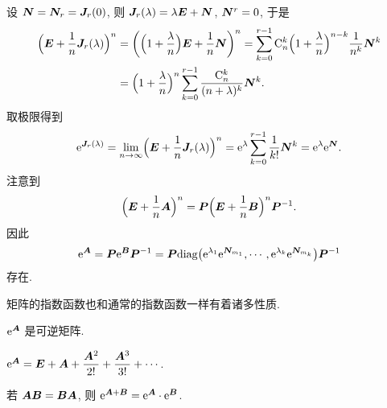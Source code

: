 设 ${\boldsymbol{N}}={\boldsymbol{N}}_r={\boldsymbol{J}}_r(0)$, 则 ${\boldsymbol{J}}_r(\lambda)=\lambda{\boldsymbol{E}}+{\boldsymbol{N}}$, ${\boldsymbol{N}}^r=0$, 于是
\begin{align*}
   \Bigl({\boldsymbol{E}}+\frac1n {\boldsymbol{J}}_r(\lambda)\Bigr)^n&
  =\biggl(\Bigl(1+\frac \lambda n\Bigr){\boldsymbol{E}}+\frac1n {\boldsymbol{N}}\biggr)^n
  =\sum_{k=0}^{r-1} {\mathrm{C}}_n^k \Bigl(1+\frac \lambda n\Bigr)^{n-k} \frac1{n^k} {\boldsymbol{N}}^k\\&
  =\Bigl(1+\frac \lambda n\Bigr)^n \sum_{k=0}^{r-1} \frac{{\mathrm{C}}_n^k}{(n+\lambda)^k}{\boldsymbol{N}}^k.
\end{align*}
取极限得到
\begin{equation}
  \label{eq:jordan-exponential}
   \ee^{\bfJ_r(\lambda)}
  =\lim_{n\ra \infty}\Bigl(\bfE+\frac1n \bfJ_r(\lambda)\Bigr)^n
  =\ee^\lambda\sum_{k=0}^{r-1} \frac1{k!}\bfN^k
  =\ee^\lambda\ee^\bfN.
\end{equation}
注意到 
\[
   \Bigl({\boldsymbol{E}}+\frac1n {\boldsymbol{A}}\Bigr)^n
  ={\boldsymbol{P}}\Bigl({\boldsymbol{E}}+\frac1n {\boldsymbol{B}}\Bigr)^n{\boldsymbol{P}}^{-1}.
\]
因此
\begin{equation}
  \label{eq:matrix-exponential}
  \ee^\bfA=\bfP\ee^{\bfB}\bfP^{-1}
  =\bfP\diag\bigl(
      \ee^{\lambda_1}\ee^{\bfN_{m_1}},\cdots,
      \ee^{\lambda_k}\ee^{\bfN_{m_k}}
    \bigr)\bfP^{-1}
\end{equation}
存在.

矩阵的指数函数也和通常的指数函数一样有着诸多性质.

\begin{theorem}
  \begin{enuma}
    \item $\mathrm{e}^{\boldsymbol{A}}$ 是可逆矩阵.
    \item $\mathrm{e}^{\boldsymbol{A}}={\boldsymbol{E}}+{\boldsymbol{A}}+\dfrac{{\boldsymbol{A}}^2}{2!}+\dfrac{{\boldsymbol{A}}^3}{3!}+\cdots$.
    \label{enum:power-series-matrix-exp}\smallskip
    \item 若 ${\boldsymbol{A}}{\boldsymbol{B}}={\boldsymbol{B}}{\boldsymbol{A}}$, 则 $\mathrm{e}^{{\boldsymbol{A}}+{\boldsymbol{B}}}=\mathrm{e}^{\boldsymbol{A}}\cdot \mathrm{e}^{\boldsymbol{B}}$.
  \end{enuma}
\end{theorem}

